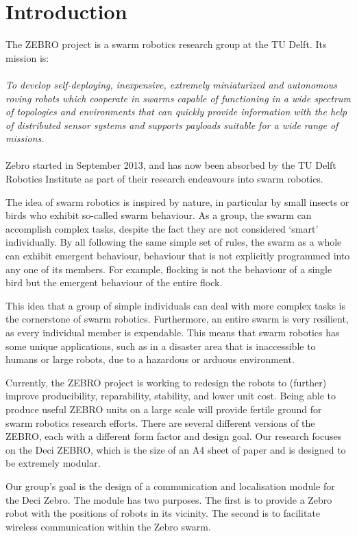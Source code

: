 \chapter{Introduction}

The ZEBRO project is a swarm robotics research group at the TU Delft.
Its mission is:
\\\\
\emph{To develop self-deploying, inexpensive, extremely miniaturized and autonomous roving robots which cooperate in swarms capable of functioning in a wide spectrum of topologies and environments that can quickly provide information with the help of distributed sensor systems and supports payloads suitable for a wide range of missions.}
\\\\
Zebro started in September 2013, and has now been absorbed by the TU Delft Robotics Institute as part of their research endeavours into swarm robotics.

The idea of swarm robotics is inspired by nature, in particular by small insects or birds who exhibit so-called swarm behaviour.
As a group, the swarm can accomplish complex tasks, despite the fact they are not considered `smart' individually.
By all following the same simple set of rules, the swarm as a whole can exhibit emergent behaviour, behaviour that is not explicitly programmed into any one of its members.
For example, flocking is not the behaviour of a single bird but the emergent behaviour of the entire flock.

This idea that a group of simple individuals can deal with more complex tasks is the cornerstone of swarm robotics.
Furthermore, an entire swarm is very resilient, as every individual member is expendable.
This means that swarm robotics has some unique applications, such as in a disaster area that is inaccessible to humans or large robots, due to a hazardous or arduous environment.

Currently, the ZEBRO project is working to redesign the robots to (further) improve producibility, reparability, stability, and lower unit cost.
Being able to produce useful ZEBRO units on a large scale will provide fertile ground for swarm robotics research efforts.
There are several different versions of the ZEBRO, each with a different form factor and design goal.
Our research focuses on the Deci ZEBRO, which is the size of an A4 sheet of paper and is designed to be extremely modular.

Our group's goal is the design of a communication and localisation module for the Deci Zebro.
The module has two purposes.
The first is to provide a Zebro robot with the positions of robots in its vicinity.
The second is to facilitate wireless communication within the Zebro swarm.

